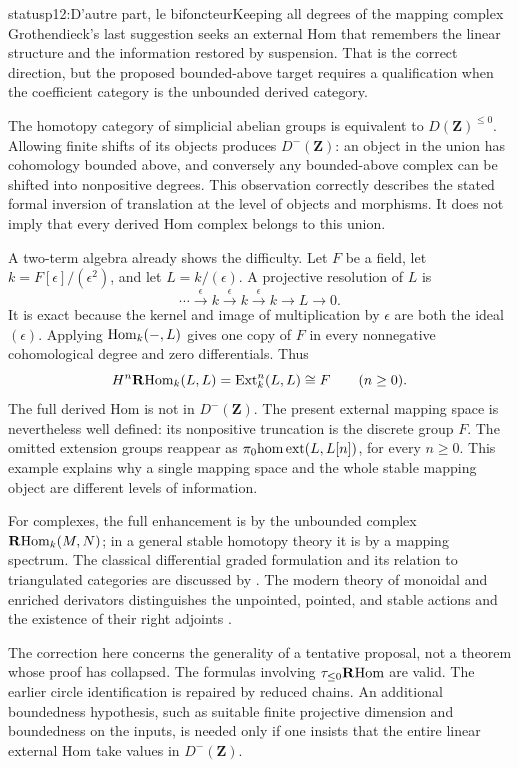 \begin{dcomment}{status}{p12:D’autre part, le bifoncteur}{Keeping all degrees of the mapping complex}
Grothendieck's last suggestion seeks an external Hom that remembers the linear structure and the information restored by suspension. That is the correct direction, but the proposed bounded-above target requires a qualification when the coefficient category is the unbounded derived category.

The homotopy category of simplicial abelian groups is equivalent to \(D(\mathbf Z)^{\leq0}\). Allowing finite shifts of its objects produces \(D^-(\mathbf Z)\): an object in the union has cohomology bounded above, and conversely any bounded-above complex can be shifted into nonpositive degrees. This observation correctly describes the stated formal inversion of translation at the level of objects and morphisms. It does not imply that every derived Hom complex belongs to this union.

A two-term algebra already shows the difficulty. Let \(F\) be a field, let \(k=F[\epsilon]/(\epsilon^2)\), and let \(L=k/(\epsilon)\). A projective resolution of \(L\) is
\[
 \cdots\xrightarrow{\epsilon}k
 \xrightarrow{\epsilon}k
 \xrightarrow{\epsilon}k\longrightarrow L\longrightarrow0.
\]
It is exact because the kernel and image of multiplication by \(\epsilon\) are both the ideal \((\epsilon)\). Applying \(\mathrm{Hom}_k(-,L)\) gives one copy of \(F\) in every nonnegative cohomological degree and zero differentials. Thus
\[
 H^n\mathbf R\mathrm{Hom}_k(L,L)=\operatorname{Ext}^n_k(L,L)
 \cong F\qquad(n\geq0).
\]
The full derived Hom is not in \(D^-(\mathbf Z)\). The present external mapping space is nevertheless well defined: its nonpositive truncation is the discrete group \(F\). The omitted extension groups reappear as
\(\pi_0\mathrm{hom}\,\mathrm{ext}(L,L[n])\), for every \(n\geq0\). This example explains why a single mapping space and the whole stable mapping object are different levels of information.

For complexes, the full enhancement is by the unbounded complex \(\mathbf R\mathrm{Hom}_k(M,N)\); in a general stable homotopy theory it is by a mapping spectrum. The classical differential graded formulation and its relation to triangulated categories are discussed by \citet[Sections 2--3]{Keller2006DG}. The modern theory of monoidal and enriched derivators distinguishes the unpointed, pointed, and stable actions and the existence of their right adjoints \citep[Sections 3 and 8--9]{GrothPontoShulman2014Additivity}.

The correction here concerns the generality of a tentative proposal, not a theorem whose proof has collapsed. The formulas involving \(\tau_{\leq0}\mathbf R\mathrm{Hom}\) are valid. The earlier circle identification is repaired by reduced chains. An additional boundedness hypothesis, such as suitable finite projective dimension and boundedness on the inputs, is needed only if one insists that the entire linear external Hom take values in \(D^-(\mathbf Z)\).
\end{dcomment}
